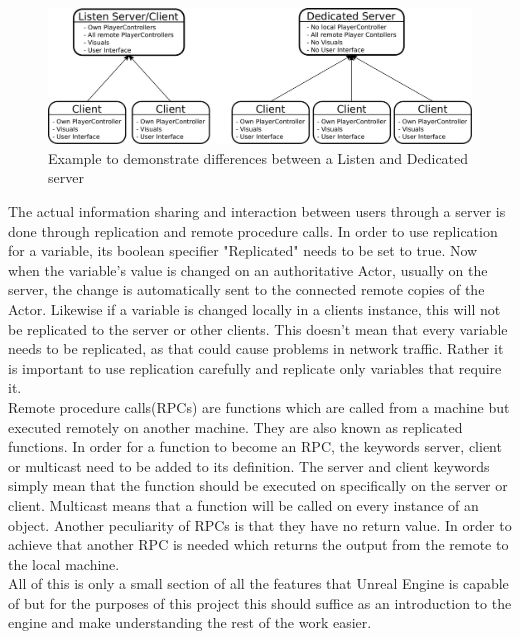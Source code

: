 \begin{figure}[htpb]
	\centering
	\includegraphics[width=1\textwidth]{fig/ListenvsDedicated.pdf}
	\caption[Difference between Listen and Dedicated Server]{Example to demonstrate differences between a Listen and Dedicated server\protect}
	\label{fig:ListenvDedicated}
\end{figure}

The actual information sharing and interaction between users through a server is done through replication and remote procedure calls. In order to use replication for a variable, its boolean specifier "Replicated" needs to be set to true. Now when the variable's value is changed on an authoritative Actor, usually on the server, the change is automatically sent to the connected remote copies of the Actor. Likewise if a variable is changed locally in a clients instance, this will not be replicated to the server or other clients. This doesn't mean that every variable needs to be replicated, as that could cause problems in network traffic. Rather it is important to use replication carefully and replicate only variables that require it.\\
Remote procedure calls(RPCs) are functions which are called from a machine but executed remotely on another machine. They are also known as replicated functions. In order for a function to become an RPC, the keywords server, client or multicast need to be added to its definition. The server and client keywords simply mean that the function should be executed on specifically on the server or client. Multicast means that a function will be called on every instance of an object. Another peculiarity of RPCs is that they have no return value. In order to achieve that another RPC is needed which returns the output from the remote to the local machine.\\
All of this is only a small section of all the features that Unreal Engine is capable of but for the purposes of this project this should suffice as an introduction to the engine and make understanding the rest of the work easier.




